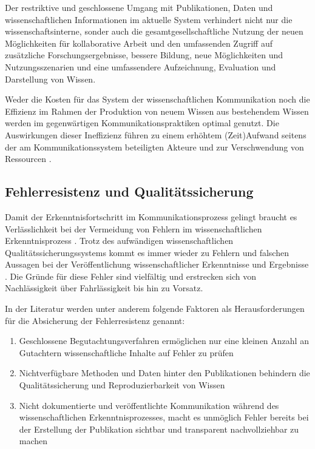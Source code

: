 Der restriktive und geschlossene Umgang mit Publikationen, Daten und wissenschaftlichen Informationen im aktuelle System verhindert nicht nur die wissenschaftsinterne, sonder auch die gesamtgesellschaftliche Nutzung der neuen Möglichkeiten für kollaborative Arbeit und den umfassenden Zugriff auf zusätzliche Forschungsergebnisse, bessere Bildung, neue Möglichkeiten und Nutzungsszenarien und eine umfassendere Aufzeichnung, Evaluation und Darstellung von Wissen.

Weder die Kosten für das System der wissenschaftlichen Kommunikation noch die Effizienz im Rahmen der Produktion von neuem Wissen aus bestehendem Wissen werden im gegenwärtigen Kommunikationspraktiken optimal genutzt. Die Auswirkungen dieser Ineffizienz führen zu einem erhöhtem (Zeit)Aufwand seitens der am Kommunikationssystem beteiligten Akteure und zur Verschwendung von Ressourcen \cite{Nosek_2012}.

\subsection{Fehlerresistenz und Qualitätssicherung}

Damit der Erkenntnisfortschritt im Kommunikationsprozess gelingt braucht es Verlässlichkeit bei der Vermeidung von Fehlern im wissenschaftlichen Erkenntnisprozess \cite{Bargheer_2015}. Trotz des aufwändigen wissenschaftlichen Qualitätssicherungssystems kommt es immer wieder zu Fehlern und falschen Aussagen bei der Veröffentlichung wissenschaftlicher Erkenntnisse und Ergebnisse \cite{Brembs_2015} \cite{Luescher_2014} \cite{Smith_2006}. Die Gründe für diese Fehler sind vielfältig und erstrecken sich von Nachlässigkeit über Fahrlässigkeit bis hin zu Vorsatz.

In der Literatur werden unter anderem folgende Faktoren als Herausforderungen für die Absicherung der Fehlerresistenz genannt:
\begin{enumerate}
\item Geschlossene Begutachtungsverfahren ermöglichen nur eine kleinen Anzahl an Gutachtern wissenschaftliche Inhalte auf Fehler zu prüfen \cite{Smith_2006}
\item Nichtverfügbare Methoden und Daten hinter den Publikationen behindern die Qualitätssicherung und Reproduzierbarkeit von Wissen \cite{Nosek_2015} \cite[:9]{Gruber_2005} \cite[:119]{Mayring_1999}
\item Nicht dokumentierte und veröffentlichte Kommunikation während des wissenschaftlichen Erkenntnisprozesses, macht es unmöglich Fehler bereits bei der Erstellung der Publikation sichtbar und transparent nachvollziehbar zu machen \cite{Nosek_2015}
\end{enumerate}

